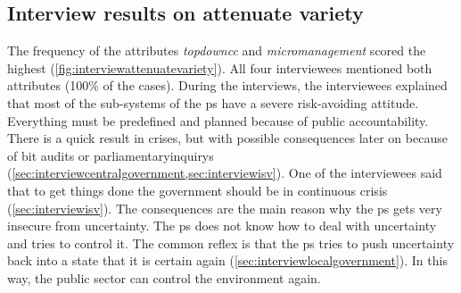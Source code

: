 \subsection{Interview results on attenuate variety}
\label{sub:interviewresultsattenuate}
The frequency of the attributes \textit{\gls{topdowncc}} and \textit{\gls{micromanagement}} scored the highest (\cref{fig:interviewattenuatevariety}). All four interviewees mentioned both \glspl{attribute} (100\% of the cases). During the interviews, the interviewees explained that most of the sub-systems of the \gls{ps} have a severe risk-avoiding attitude. Everything must be predefined and planned because of public accountability. There is a quick result in crises, but with possible consequences later on because of \gls{bit} audits or \glspl{parliamentaryinquiry} (\cref{sec:interviewcentralgovernment,sec:interviewisv}). One of the interviewees said that to get things done the government should be in continuous crisis (\cref{sec:interviewisv}). The consequences are the main reason why the \gls{ps} gets very insecure from \gls{uncertainty}. The \gls{ps} does not know how to deal with \gls{uncertainty} and tries to control it. The common reflex is that the \gls{ps} tries to push \gls{uncertainty} back into a state that it is certain again (\cref{sec:interviewlocalgovernment}). In this way, the public sector can control the environment again.
